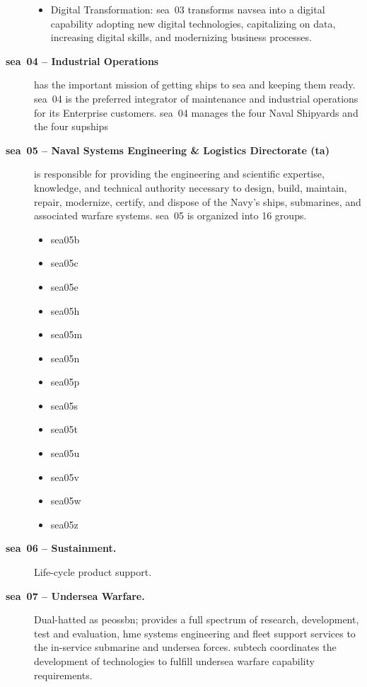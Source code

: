 \documentclass[../src/main.tex]{subfiles}
\begin{document}
\begin{description}
\begin{itemize}
    \item Digital Transformation: \ac{sea}~03 transforms \ac{navsea} into a digital capability adopting new digital technologies, capitalizing on data, increasing digital skills, and modernizing business processes.
  \end{itemize}
  \item[\textbf{\ac{sea}~04 -- Industrial Operations}] has the important mission of getting ships to sea and keeping them ready. \ac{sea}~04 is the preferred integrator of maintenance and industrial operations for its Enterprise customers. \ac{sea}~04 manages the four Naval Shipyards and the four \acp{supship}~
  \item[\textbf{\ac{sea}~05 -- Naval Systems Engineering \& Logistics Directorate (\ac{ta})}] is responsible for providing the engineering and scientific expertise, knowledge, and technical authority necessary to design, build, maintain, repair, modernize, certify, and dispose of the Navy's ships, submarines, and associated warfare systems. \ac{sea}~05 is organized into 16 groups. 
  \begin{itemize}
    \item \ac{sea05b}
    \item \ac{sea05c}
    \item \ac{sea05e}
    \item \ac{sea05h}
    \item \ac{sea05m}
    \item \ac{sea05n}
    \item \ac{sea05p}
    \item \ac{sea05s}
    \item \ac{sea05t}
    \item \ac{sea05u}
    \item \ac{sea05v}
    \item \ac{sea05w}
    \item \ac{sea05z}
  \end{itemize}
  \item[\textbf{\ac{sea}~06 -- Sustainment.}] Life-cycle product support.
  \item[\textbf{\ac{sea}~07 -- Undersea Warfare.}] Dual-hatted as \ac{peossbn}; provides a full spectrum of research, development, test and evaluation, \ac{hme} systems engineering and fleet support services to the in-service submarine and undersea forces. \ac{subtech} coordinates the development of technologies to fulfill undersea warfare capability requirements.

\end{description}
\end{document}
